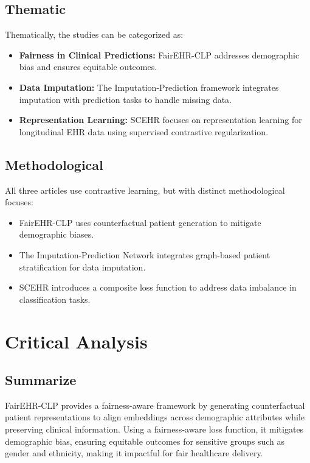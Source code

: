 \documentclass[a4paper]{article}
\begin{document}
    \subsection{Thematic}
    Thematically, the studies can be categorized as:
    \begin{itemize}
        \item \textbf{Fairness in Clinical Predictions:} FairEHR-CLP addresses
            demographic bias and ensures equitable outcomes.

        \item \textbf{Data Imputation:} The Imputation-Prediction framework
            integrates imputation with prediction tasks to handle missing data.

        \item \textbf{Representation Learning:} SCEHR focuses on representation
            learning for longitudinal EHR data using supervised contrastive
            regularization.
    \end{itemize}

    \subsection{Methodological}
    All three articles use contrastive learning, but with distinct
    methodological focuses:
    \begin{itemize}
        \item FairEHR-CLP uses counterfactual patient generation to mitigate demographic
            biases.

        \item The Imputation-Prediction Network integrates graph-based patient stratification
            for data imputation.

        \item SCEHR introduces a composite loss function to address data imbalance
            in classification tasks.
    \end{itemize}

    \section{Critical Analysis}

    \subsection{Summarize}
    FairEHR-CLP provides a fairness-aware framework by generating counterfactual
    patient representations to align embeddings across demographic attributes while
    preserving clinical information. Using a fairness-aware loss function, it mitigates
    demographic bias, ensuring equitable outcomes for sensitive groups such as
    gender and ethnicity, making it impactful for fair healthcare delivery.
\end{document}
